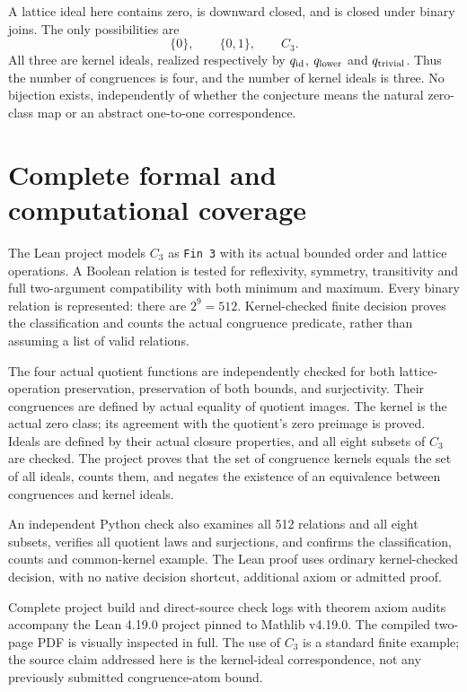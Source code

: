 \documentclass[11pt,a4paper]{article}
\begin{document}
A lattice ideal here contains zero, is downward closed, and is closed under binary joins. The only possibilities are
\[
 \{0\},\qquad \{0,1\},\qquad C_3.
\]
All three are kernel ideals, realized respectively by $q_{\rm id}$, $q_{\rm lower}$ and $q_{\rm trivial}$. Thus the number of congruences is four, and the number of kernel ideals is three. No bijection exists, independently of whether the conjecture means the natural zero-class map or an abstract one-to-one correspondence.

\section*{Complete formal and computational coverage}
The Lean project models $C_3$ as \texttt{Fin 3} with its actual bounded order and lattice operations. A Boolean relation is tested for reflexivity, symmetry, transitivity and full two-argument compatibility with both minimum and maximum. Every binary relation is represented: there are $2^9=512$. Kernel-checked finite decision proves the classification and counts the actual congruence predicate, rather than assuming a list of valid relations.

The four actual quotient functions are independently checked for both lattice-operation preservation, preservation of both bounds, and surjectivity. Their congruences are defined by actual equality of quotient images. The kernel is the actual zero class; its agreement with the quotient's zero preimage is proved. Ideals are defined by their actual closure properties, and all eight subsets of $C_3$ are checked. The project proves that the set of congruence kernels equals the set of all ideals, counts them, and negates the existence of an equivalence between congruences and kernel ideals.

An independent Python check also examines all 512 relations and all eight subsets, verifies all quotient laws and surjections, and confirms the classification, counts and common-kernel example. The Lean proof uses ordinary kernel-checked decision, with no native decision shortcut, additional axiom or admitted proof.

Complete project build and direct-source check logs with theorem axiom audits accompany the Lean 4.19.0 project pinned to Mathlib v4.19.0. The compiled two-page PDF is visually inspected in full. The use of $C_3$ is a standard finite example; the source claim addressed here is the kernel-ideal correspondence, not any previously submitted congruence-atom bound.
\end{document}
